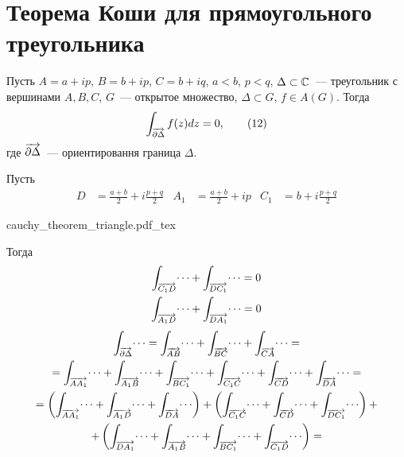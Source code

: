 \documentclass[main]{subfiles}
\begin{document}
\section{Теорема Коши для прямоугольного треугольника}
\begin{theorem}
    Пусть $A = a + ip$, $B = b + ip$, $C = b + iq$, $a < b$, $p < q$, $\Delta \subset \mathbb{C}$~--- треугольник с вершинами $A,B,C$, $G$~--- открытое множество, $\Delta \subset G$, $f \in A(G)$.
    Тогда
    \[\AnClOrInt[\AnClOrCurve[\partial \Delta]] f(z) dz = 0, \tag{12}\]
    где $\AnClOrCurve[\partial \Delta]$~--- ориентировання граница $\Delta$.
\end{theorem}
\begin{longProof}
    Пусть
    \begin{align*}
        D & = \frac{a + b}{2} + i \frac{p + q}{2} & A_1 & = \frac{a + b}{2} + ip & C_1 & = b + i \frac{p + q}{2}
    \end{align*}
    \begin{center}
        {cauchy_theorem_triangle.pdf_tex}
    \end{center}
    Тогда
    \begin{gather*}
        \AnClOrInt[\AnClOrCurve[C_1 D]] \dotsi + \AnClOrInt[\AnClOrCurve[D C_1]] \dotsi = 0 \\
        \AnClOrInt[\AnClOrCurve[A_1 D]] \dotsi + \AnClOrInt[\AnClOrCurve[D A_1]] \dotsi = 0
    \end{gather*}
    \begin{multline*}
        \AnClOrInt[\AnClOrCurve[\partial \Delta]] \dotsi = \AnClOrInt[\AnClOrCurve[AB]] \dotsi + \AnClOrInt[\AnClOrCurve[BC]] \dotsi + \AnClOrInt[\AnClOrCurve[CA]] \dotsi = \\
        = \AnClOrInt[\AnClOrCurve[AA_1]] \dotsi + \AnClOrInt[\AnClOrCurve[A_1 B]] \dotsi + \AnClOrInt[\AnClOrCurve[BC_1]] \dotsi + \AnClOrInt[\AnClOrCurve[C_1 C]] \dotsi + \AnClOrInt[\AnClOrCurve[CD]] \dotsi + \AnClOrInt[\AnClOrCurve[DA]] \dotsi = \\
        = \left( \AnClOrInt[\AnClOrCurve[AA_1]] \dotsi + \AnClOrInt[\AnClOrCurve[A_1 D]] \dotsi + \AnClOrInt[\AnClOrCurve[DA]] \dotsi \right) + \left( \AnClOrInt[\AnClOrCurve[C_1 C]] \dotsi + \AnClOrInt[\AnClOrCurve[CD]] \dotsi + \AnClOrInt[\AnClOrCurve[DC_1]] \dotsi\right) + \\
        + \left( \AnClOrInt[\AnClOrCurve[DA_1]] \dotsi + \AnClOrInt[\AnClOrCurve[A_1 B]] \dotsi + \AnClOrInt[\AnClOrCurve[BC_1]] \dotsi + \AnClOrInt[\AnClOrCurve[C_1 D]] \dotsi\right) = \\

\end{multline*}
\end{longProof}
\end{document}
